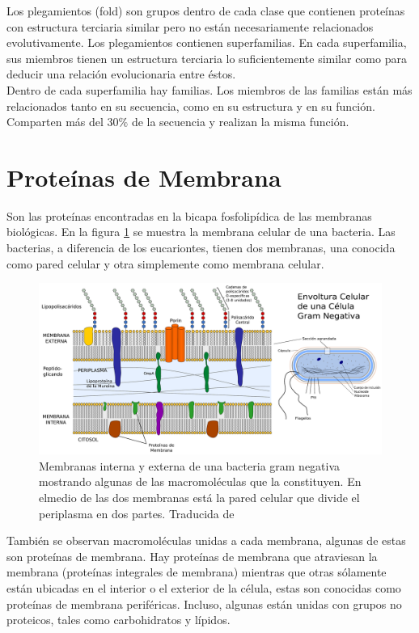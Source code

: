 Los plegamientos (fold) son grupos dentro de cada clase que contienen prote\'{i}nas con estructura terciaria similar pero no est\'{a}n necesariamente relacionados evolutivamente. Los plegamientos contienen superfamilias. En cada superfamilia, sus miembros tienen un estructura terciaria lo suficientemente similar como para deducir una relaci\'{o}n evolucionaria entre \'{e}stos.\\

Dentro de cada superfamilia hay familias. Los miembros de las familias est\'{a}n m\'{a}s relacionados tanto en su secuencia, como en su estructura y en su funci\'{o}n. Comparten m\'{a}s del $30\%$ de la secuencia y realizan la misma funci\'{o}n.

\section{Prote\'{i}nas de Membrana}
Son las prote\'{i}nas encontradas en la bicapa fosfolip\'{i}dica de las membranas biol\'{o}gicas. En la figura  \ref{fig:cell} se muestra la membrana 
celular de una bacteria. Las bacterias, a diferencia de los eucariontes, tienen dos membranas, una conocida como pared celular y otra simplemente como membrana celular.\\
\begin{figure}[H]
\centering
\includegraphics[scale=0.3]{Kap3/cell_wall.pdf}
\caption{Membranas interna y externa de una bacteria gram negativa mostrando algunas de las macromol\'{e}culas que la constituyen. En elmedio de las dos membranas est\'{a} la pared celular que divide el periplasma en dos partes. Traducida de \cite{Dahl2008File:Gram-}}\label{fig:cell}
\end{figure}
Tambi\'{e}n se observan macromol\'{e}culas unidas a cada membrana, algunas de estas son prote\'{i}nas de membrana. Hay prote\'{i}nas de membrana que atraviesan la membrana (prote\'{i}nas integrales de membrana) mientras que otras s\'{o}lamente est\'{a}n ubicadas en el interior o 
el exterior de la c\'{e}lula, estas son conocidas como prote\'{i}nas de membrana perif\'{e}ricas. Incluso, algunas est\'{a}n unidas con grupos no proteicos, tales como carbohidratos y l\'{i}pidos.\\

